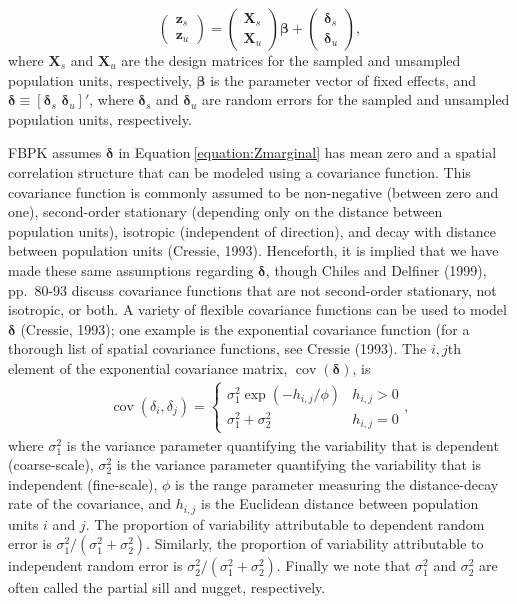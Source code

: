 \documentclass[]{elsarticle} %
\begin{document}
\begin{equation}
\begin{pmatrix} \label{equation:Zmarginal}
    \mathbf{z}_s      \\
    \mathbf{z}_u
\end{pmatrix}
=
\begin{pmatrix}
  \mathbf{X}_s    \\
  \mathbf{X}_u
\end{pmatrix}
\bm{\beta} +
\begin{pmatrix}
\bm{\delta}_s    \\
\bm{\delta}_u
\end{pmatrix},
\end{equation} where \(\mathbf{X}_s\) and \(\mathbf{X}_u\) are the
design matrices for the sampled and unsampled population units,
respectively, \(\bm{\beta}\) is the parameter vector of fixed effects,
and \(\bm{\delta} \equiv [\bm{\delta}_s \,\, \bm{\delta}_u]'\), where
\(\bm{\delta}_s\) and \(\bm{\delta}_u\) are random errors for the
sampled and unsampled population units, respectively.

FBPK assumes \(\bm{\delta}\) in Equation\(~\)\ref{equation:Zmarginal}
has mean zero and a spatial correlation structure that can be modeled
using a covariance function. This covariance function is commonly
assumed to be non-negative (between zero and one), second-order
stationary (depending only on the distance between population units),
isotropic (independent of direction), and decay with distance between
population units (Cressie, 1993). Henceforth, it is implied that we have
made these same assumptions regarding \(\bm{\delta}\), though Chiles and
Delfiner (1999), pp.~80-93 discuss covariance functions that are not
second-order stationary, not isotropic, or both. A variety of flexible
covariance functions can be used to model \(\bm{\delta}\) (Cressie,
1993); one example is the exponential covariance function (for a
thorough list of spatial covariance functions, see Cressie (1993). The
\(i,j\)th element of the exponential covariance matrix,
\(\mathop{\mathrm{{cov}}}(\bm{\delta})\), is \mbox{}
\begin{align}\label{equation:expcov}
\mathop{\mathrm{{cov}}}(\delta_i, \delta_j) = 
\begin{cases} 
\sigma^2_{1}\exp(-h_{i,j}/\phi) & h_{i,j} > 0 \\
\sigma^2_{1} + \sigma^2_2 & h_{i,j} = 0
\end{cases}
,
\end{align} where \(\sigma^2_{1}\) is the variance parameter quantifying
the variability that is dependent (coarse-scale), \(\sigma^2_{2}\) is
the variance parameter quantifying the variability that is independent
(fine-scale), \(\phi\) is the range parameter measuring the
distance-decay rate of the covariance, and \(h_{i,j}\) is the Euclidean
distance between population units \(i\) and \(j\). The proportion of
variability attributable to dependent random error is
\(\sigma^2_{1} / (\sigma^2_{1} + \sigma^2_{2})\). Similarly, the
proportion of variability attributable to independent random error is
\(\sigma^2_{2} / (\sigma^2_{1} + \sigma^2_{2})\). Finally we note that
\(\sigma^2_{1}\) and \(\sigma^2_{2}\) are often called the partial sill
and nugget, respectively.
\end{document}
